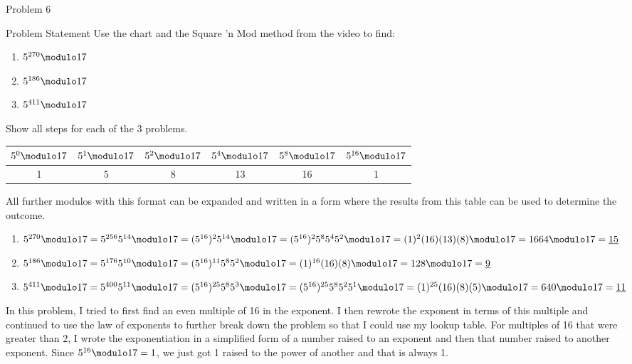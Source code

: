 \begin{problem}{Problem 6}
    \begin{statement}{Problem Statement}
        Use the chart and the Square 'n Mod method from the video to find:

        \begin{enumerate}[label = (\alph*)]
            \item $5^{270} \modulo 17$
            \item $5^{186} \modulo 17$
            \item $5^{411} \modulo 17$
        \end{enumerate}
        Show all steps for each of the 3 problems.
    \end{statement}

    \begin{highlight}
        \begin{center}
            \begin{tabular}[ht]{|c|c|c|c|c|c|}
                \hline $5^{0} \modulo 17$ & $5^{1} \modulo 17$ & $5^{2} \modulo 17$ & $5^{4} \modulo 17$ & $5^{8} \modulo 17$ & $5^{16} \modulo 17$ \\ \hline
                1 & 5 & 8 & 13 & 16 & 1 \\ \hline
            \end{tabular}
        \end{center}
        All further modulos with this format can be expanded and written in a form where the results from this table can be used to determine the outcome.
    \end{highlight}

    \begin{highlight}[Solution]
        \begin{enumerate}[label = (\alph*)]
            \item $5^{270} \modulo 17 = 5^{256}5^{14} \modulo 17 = (5^{16})^{2}5^{14} \modulo 17 = (5^{16})^{2}5^{8}5^{4}5^{2} \modulo 17 = (1)^{2}(16)(13)(8) \modulo 17 = 1664 \modulo 17 = \underbar{15}$
            \item $5^{186} \modulo 17 = 5^{176}5^{10} \modulo 17 = (5^{16})^{11}5^{8}5^{2} \modulo 17 = (1)^{16}(16)(8) \modulo 17 = 128 \modulo 17 = \underbar{9}$
            \item $5^{411} \modulo 17 = 5^{400}5^{11} \modulo 17 = (5^{16})^{25}5^{8}5^{3} \modulo 17 = (5^{16})^{25}5^{8}5^{2}5^{1} \modulo 17 = (1)^{25}(16)(8)(5) \modulo 17 = 640 \modulo 17 = \underbar{11}$
        \end{enumerate}
        In this problem, I tried to first find an even multiple of 16 in the exponent. I then rewrote the exponent in terms of this multiple and continued to use the law of exponents to further break
        down the problem so that I could use my lookup table. For multiples of 16 that were greater than 2, I wrote the exponentiation in a simplified form of a number raised to an exponent and then
        that number raised to another exponent. Since $5^{16} \modulo 17 = 1$, we just got 1 raised to the power of another and that is always 1.
    \end{highlight}
\end{problem}

